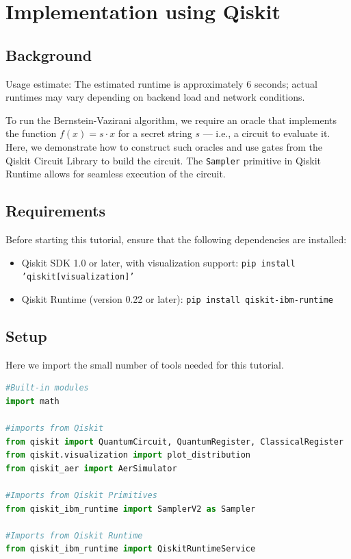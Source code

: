 \section{Implementation using Qiskit}
\subsection{Background}
Usage estimate: The estimated runtime is approximately 6 seconds; actual runtimes may vary depending on backend load and network conditions.

To run the Bernstein-Vazirani algorithm, we require an oracle that implements the function $f(x) = s \cdot x$ for a secret string $s$ — i.e., a circuit to evaluate it. Here, we demonstrate how to construct such oracles and use gates from the Qiskit Circuit Library to build the circuit. The \texttt{Sampler} primitive in Qiskit Runtime allows for seamless execution of the circuit.

\subsection{Requirements}
Before starting this tutorial, ensure that the following dependencies are installed:
\begin{itemize}
    \item Qiskit SDK 1.0 or later, with visualization support: \texttt{pip install 'qiskit[visualization]'}
    \item Qiskit Runtime (version 0.22 or later): \texttt{pip install qiskit-ibm-runtime}
\end{itemize}

\subsection{Setup}
Here we import the small number of tools needed for this tutorial.

\begin{lstlisting}[language=Python]
#Built-in modules
import math

#imports from Qiskit
from qiskit import QuantumCircuit, QuantumRegister, ClassicalRegister
from qiskit.visualization import plot_distribution
from qiskit_aer import AerSimulator

#Imports from Qiskit Primitives
from qiskit_ibm_runtime import SamplerV2 as Sampler

#Imports from Qiskit Runtime
from qiskit_ibm_runtime import QiskitRuntimeService
\end{lstlisting}


